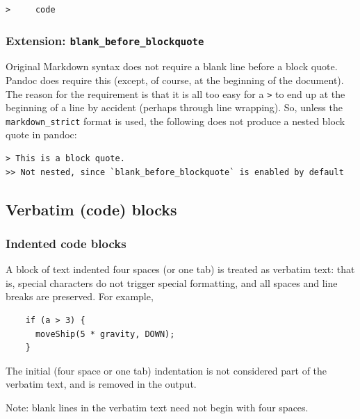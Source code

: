 \documentclass[
]{article}
\begin{document}
\begin{verbatim}
>     code
\end{verbatim}

\hypertarget{extension-blank_before_blockquote}{%
\subsubsection{\texorpdfstring{Extension:
\texttt{blank\_before\_blockquote}}{Extension: blank\_before\_blockquote}}\label{extension-blank_before_blockquote}}

Original Markdown syntax does not require a blank line before a block
quote. Pandoc does require this (except, of course, at the beginning of
the document). The reason for the requirement is that it is all too easy
for a \texttt{\textgreater{}} to end up at the beginning of a line by
accident (perhaps through line wrapping). So, unless the
\texttt{markdown\_strict} format is used, the following does not produce
a nested block quote in pandoc:

\begin{verbatim}
> This is a block quote.
>> Not nested, since `blank_before_blockquote` is enabled by default
\end{verbatim}

\hypertarget{verbatim-code-blocks}{%
\subsection{Verbatim (code) blocks}\label{verbatim-code-blocks}}

\hypertarget{indented-code-blocks}{%
\subsubsection{Indented code blocks}\label{indented-code-blocks}}

A block of text indented four spaces (or one tab) is treated as verbatim
text: that is, special characters do not trigger special formatting, and
all spaces and line breaks are preserved. For example,

\begin{verbatim}
    if (a > 3) {
      moveShip(5 * gravity, DOWN);
    }
\end{verbatim}

The initial (four space or one tab) indentation is not considered part
of the verbatim text, and is removed in the output.

Note: blank lines in the verbatim text need not begin with four spaces.
\end{document}
